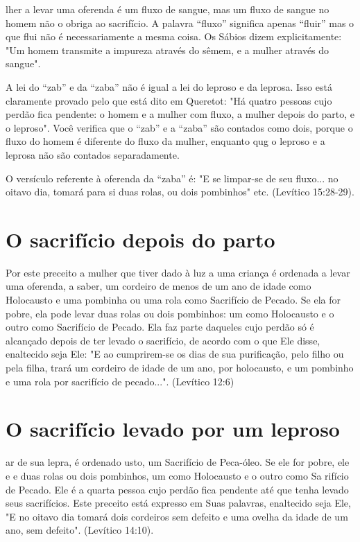 lher a levar uma oferenda é um fluxo de sangue, mas um fluxo de sangue
no homem não o obriga ao sacrifício. A palavra ``fluxo'' significa apenas
``fluir'' mas o que flui não é necessariamente a mesma coisa. Os Sábios
dizem explicita­mente: "Um homem transmite a impureza através do sêmem,
e a mulher atra­vés do sangue".

A lei do ``zab'' e da ``zaba'' não é igual a lei do leproso e da leprosa.
Isso está claramente provado pelo que está dito em Queretot: "Há quatro
pes­soas cujo perdão fica pendente: o homem e a mulher com fluxo, a
mulher de­pois do parto, e o leproso". Você verifica que o ``zab'' e a
``zaba'' são contados como dois, porque o fluxo do homem é diferente do
fluxo da mulher, enquan­to qug o leproso e a leprosa não são contados
separadamente.

O versículo referente à oferenda da ``zaba'' é: "E se limpar-se de seu
fluxo... no oitavo dia, tomará para si duas rolas, ou dois pombinhos"
etc. (Leví­tico 15:28-29).

\section{O sacrifício depois do parto}

Por este preceito a mulher que tiver dado à luz a uma criança é
orde­nada a levar uma oferenda, a saber, um cordeiro de menos de um ano
de idade como Holocausto e uma pombinha ou uma rola como Sacrifício de
Pecado. Se ela for pobre, ela pode levar duas rolas ou dois pombinhos:
um como Holo­causto e o outro como Sacrifício de Pecado. Ela faz parte
daqueles cujo perdão só é alcançado depois de ter levado o sacrifício,
de acordo com o que Ele disse, enaltecido seja Ele: "E ao cumprirem-se
os dias de sua purificação, pelo filho ou pela filha, trará um cordeiro
de idade de um ano, por holocausto, e um pom­binho e uma rola por
sacrifício de pecado...". (Levítico 12:6)

\section{O sacrifício levado por um leproso}

ar de sua lepra, é ordenado usto, um Sacrifício de Peca-óleo. Se ele for
pobre, ele e e duas rolas ou dois pombi­nhos, um como Holocausto e o
outro como Sa rifício de Pecado. Ele é a quarta pessoa cujo perdão fica
pendente até que tenha levado seus sacrifícios. Este pre­ceito está
expresso em Suas palavras, enaltecido seja Ele, "E no oitavo dia to­mará
dois cordeiros sem defeito e uma ovelha da idade de um ano, sem
defei­to". (Levítico 14:10).

